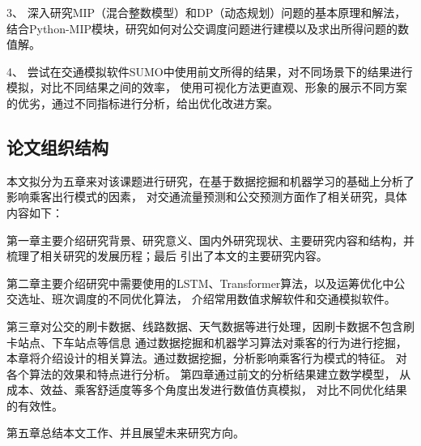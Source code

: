 3、 深入研究MIP（混合整数模型）和DP（动态规划）问题的基本原理和解法，
结合Python-MIP模块，研究如何对公交调度问题进行建模以及求出所得问题的数值解。

4、 尝试在交通模拟软件SUMO中使用前文所得的结果，对不同场景下的结果进行模拟，对比不同结果之间的效率，
使用可视化方法更直观、形象的展示不同方案的优劣，通过不同指标进行分析，给出优化改进方案。
\subsection{论文组织结构}
本文拟分为五章来对该课题进行研究，在基于数据挖掘和机器学习的基础上分析了影响乘客出行模式的因素，
对交通流量预测和公交预测方面作了相关研究，具体内容如下：

第一章主要介绍研究背景、研究意义、国内外研究现状、主要研究内容和结构，并梳理了相关研究的发展历程；最后
引出了本文的主要研究内容。

第二章主要介绍研究中需要使用的LSTM、Transformer算法，以及运筹优化中公交选址、班次调度的不同优化算法，
介绍常用数值求解软件和交通模拟软件。

第三章对公交的刷卡数据、线路数据、天气数据等进行处理，因刷卡数据不包含刷卡站点、下车站点等信息
通过数据挖掘和机器学习算法对乘客的行为进行挖掘，
本章将介绍设计的相关算法。通过数据挖掘，分析影响乘客行为模式的特征。
对各个算法的效果和特点进行分析。
第四章通过前文的分析结果建立数学模型，
从成本、效益、乘客舒适度等多个角度出发进行数值仿真模拟，
对比不同优化结果的有效性。

第五章总结本文工作、并且展望未来研究方向。
